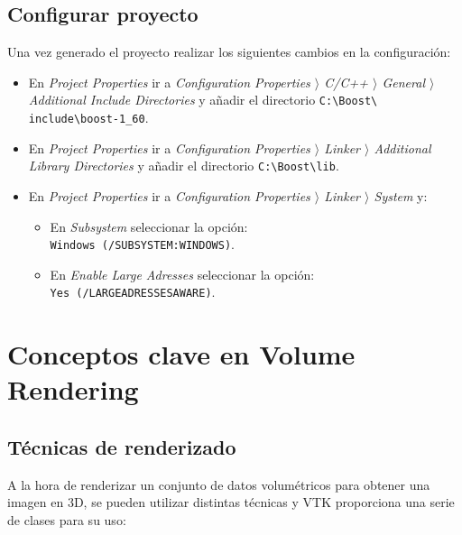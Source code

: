 \subsection{Configurar proyecto}

Una vez generado el proyecto realizar los siguientes cambios en la configuración: 
\begin{itemize}
	\item En \textit{Project Properties} ir a \textit{Configuration Properties $ \rangle $ C/C++ $ \rangle $ General $ \rangle $ Additional Include Directories} y añadir el directorio \texttt{C:\textbackslash Boost\textbackslash \\  include\textbackslash boost-1\_60}.
	\item En \textit{Project Properties} ir a \textit{Configuration Properties $ \rangle $ Linker $ \rangle $ Additional Library Directories} y añadir el directorio \texttt{C:\textbackslash Boost\textbackslash lib}.
	\item En \textit{Project Properties} ir a \textit{Configuration Properties $ \rangle $ Linker $ \rangle $ System} y:
	\begin{itemize}
		\item En \textit{Subsystem} seleccionar la opción: \\ \texttt{Windows (/SUBSYSTEM:WINDOWS)}.
		\item  En \textit{Enable Large Adresses} seleccionar la opción: \\ \texttt{Yes (/LARGEADRESSESAWARE)}.
	\end{itemize}
\end{itemize}

\section{Conceptos clave en Volume Rendering}

\subsection{Técnicas de renderizado}

A la hora de renderizar un conjunto de datos volumétricos para obtener una imagen en 3D, se pueden utilizar distintas técnicas y VTK proporciona una serie de clases para su uso:

